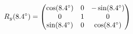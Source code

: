 \documentclass[preview]{standalone}
\begin{document}
\begin{align*}
\special{dvisvgm:raw <g id='unique000'>}R_y(8.4^\circ) = \begin{pmatrix} \cos(8.4^\circ) & 0 & -\sin(8.4^\circ) \\ 0 & 1 & 0 \\ \sin(8.4^\circ) & 0 & \cos(8.4^\circ) \end{pmatrix}\special{dvisvgm:raw </g>}
\end{align*}
\end{document}
